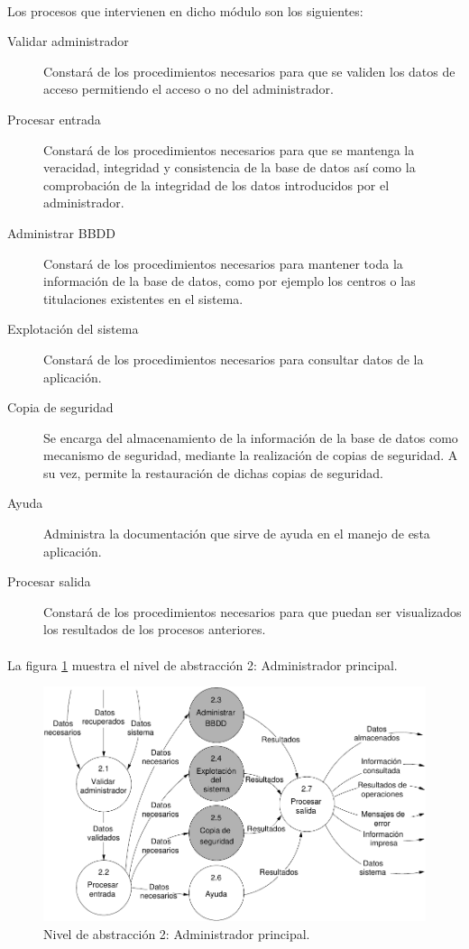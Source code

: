 \paragraph{}Los procesos que intervienen en dicho módulo son los siguientes:

\begin{description}
 \item[Validar administrador] Constará de los procedimientos necesarios para que
      se validen los datos de acceso permitiendo el acceso o no del
      administrador.
 \item[Procesar entrada] Constará de los procedimientos necesarios para que se
      mantenga la veracidad, integridad y consistencia de la base de datos así
      como la comprobación de la integridad de los datos introducidos por el
      administrador.
 \item[Administrar BBDD] Constará de los procedimientos necesarios para mantener
      toda la información de la base de datos, como por ejemplo los centros o
      las titulaciones existentes en el sistema.
 \item[Explotación del sistema]  Constará de los procedimientos necesarios para
      consultar datos de la aplicación.
 \item[Copia de seguridad] Se encarga del almacenamiento de la información de la
      base de datos como mecanismo de seguridad, mediante la realización de
      copias de seguridad. A su vez, permite la restauración de dichas copias de
      seguridad.
 \item[Ayuda] Administra la documentación que sirve de ayuda en el manejo de
      esta aplicación.
 \item[Procesar salida] Constará de los procedimientos necesarios para que
      puedan ser visualizados los resultados de los procesos anteriores.
\end{description}

\paragraph{}La figura \ref{diagramaNivel2-AdmPrincipal} muestra el nivel de
abstracción 2: Administrador principal.

  \begin{figure}[!ht]
    \begin{center}
      \includegraphics[]{08.Analisis_Funcional/8.2.DFDs/Niveles/Nivel2/Diagramas/nivel2-AdmPrincipal.pdf}
      \caption{Nivel de abstracción 2: Administrador principal.}
      \label{diagramaNivel2-AdmPrincipal}
    \end{center}
  \end{figure}
